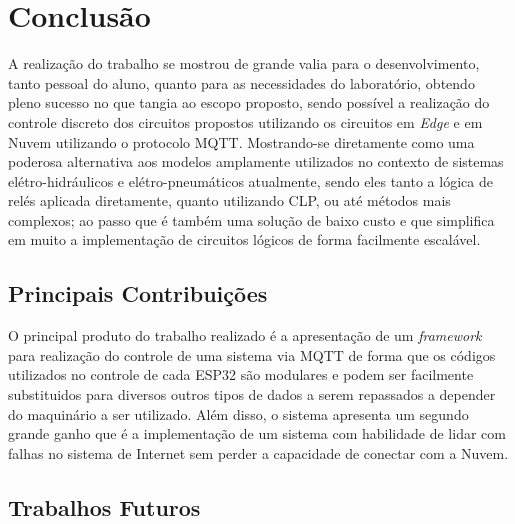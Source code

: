 \chapter[Conclusão]{Conclusão}

A realização do trabalho se mostrou de grande valia para o desenvolvimento, tanto pessoal do aluno, quanto para as 
necessidades do laboratório, obtendo pleno sucesso no que tangia ao escopo proposto, sendo possível a realização
do controle discreto dos circuitos propostos utilizando os circuitos em \textit{Edge} e em Nuvem utilizando o protocolo MQTT. 
Mostrando-se diretamente como uma poderosa alternativa aos modelos amplamente utilizados no contexto de sistemas 
elétro-hidráulicos e elétro-pneumáticos atualmente, sendo eles tanto a lógica de relés aplicada diretamente, quanto utilizando \ac{CLP}, ou até métodos 
mais complexos; ao passo que é também uma solução de baixo custo e que simplifica em muito a implementação de circuitos
lógicos de forma facilmente escalável. 

\section{Principais Contribuições}

O principal produto do trabalho realizado é a apresentação de um \textit{framework} para realização do controle de uma sistema
 via MQTT de forma que os códigos utilizados no controle de cada ESP32 são modulares e podem ser facilmente substituidos
 para diversos outros tipos de dados a serem repassados a depender do maquinário a ser utilizado. Além disso, o sistema
 apresenta um segundo grande ganho que é a implementação de um sistema com habilidade de lidar com falhas no sistema de 
 Internet sem perder a capacidade de conectar com a Nuvem.

\section{Trabalhos Futuros}

